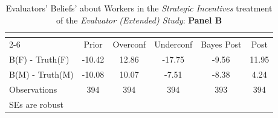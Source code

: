 \begin{table}[htbp]\centering
\caption{Evaluators' Beliefs' about Workers in the \textit{Strategic Incentives} treatment of the \textit{Evaluator (Extended) Study}: \textbf{Panel B}}
\begin{tabular}{l*{5}{c}}
\hline\hline
                &\multicolumn{5}{c}{}                             \\\cmidrule(lr){2-6}
                &\multicolumn{1}{c}{Prior}&\multicolumn{1}{c}{Overconf}&\multicolumn{1}{c}{Underconf}&\multicolumn{1}{c}{Bayes Post}&\multicolumn{1}{c}{Post}\\
\hline
B(F) - Truth(F) &   -10.42&    12.86&   -17.75&    -9.56&    11.95\\
B(M) - Truth(M) &   -10.08&    10.07&    -7.51&    -8.38&     4.24\\
\hline
Observations    &      394&      394&      394&      393&      394\\
\hline\hline
\multicolumn{6}{l}{\footnotesize SEs are robust}\\
\end{tabular}
\end{table}
